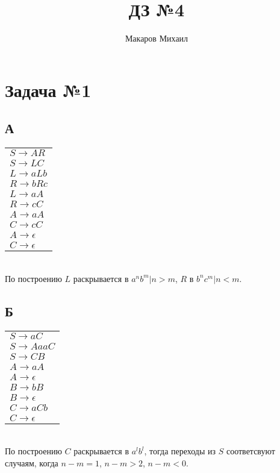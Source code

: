 \documentclass{article}
\title{ДЗ №4}
\author{Макаров Михаил}
\date{}
\begin{document}
	\maketitle

    \section{Задача №1}
    \subsection{А}
    \begin{tabular}{l}
    $ S \to AR $\\
    $ S \to LC $\\
    $ L \to aLb $\\
    $ R \to bRc $\\
    $ L \to aA $\\
    $ R \to cC $\\
    $ A \to aA $\\
    $ C \to cC $\\
    $ A \to \epsilon$\\
    $ C \to \epsilon$\\
    \end{tabular}\\
    По построению $L$ раскрывается в $a^nb^m|n > m$, $R$ в $b^nc^m|n < m$.
    \subsection{Б}
    \begin{tabular}{l}
    $ S \to aC $\\
    $ S \to AaaC$\\
    $ S \to CB$\\
    $ A \to aA$\\
    $ A \to \epsilon$\\
    $ B \to bB$\\
    $ B \to \epsilon$\\
    $ C \to aCb $\\
    $ C \to \epsilon$\\
    \end{tabular}\\
    По построению $C$ раскрывается в $a^lb^l$, тогда переходы из $S$ соответсвуют случаям, когда 
    $n - m = 1$, $n - m > 2$, $n - m < 0$.
\end{document}
